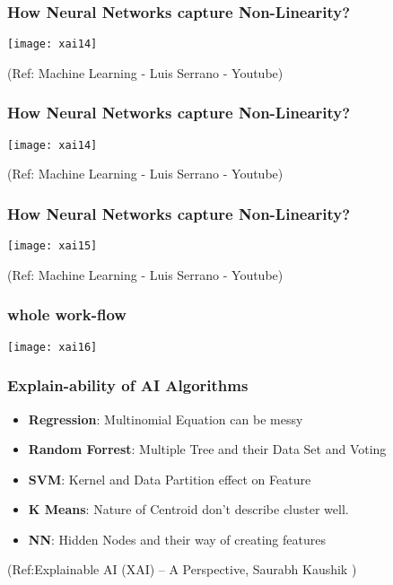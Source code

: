 \begin{frame}[fragile]\frametitle{How Neural Networks capture Non-Linearity?}
\begin{center}
\texttt{[image: xai14]}
\end{center}

\tiny{(Ref: Machine Learning - Luis Serrano - Youtube)}
\end{frame}

\begin{frame}[fragile]\frametitle{How Neural Networks capture Non-Linearity?}
\begin{center}
\texttt{[image: xai14]}
\end{center}

\tiny{(Ref: Machine Learning - Luis Serrano - Youtube)}
\end{frame}

\begin{frame}[fragile]\frametitle{How Neural Networks capture Non-Linearity?}
\begin{center}
\texttt{[image: xai15]}
\end{center}

\tiny{(Ref: Machine Learning - Luis Serrano - Youtube)}
\end{frame}

\begin{frame}[fragile]\frametitle{whole work-flow}
\begin{center}
\texttt{[image: xai16]}
\end{center}

\end{frame}

\begin{frame}[fragile]\frametitle{Explain-ability of AI Algorithms}
\begin{itemize}
\item {\bf Regression}: Multinomial Equation can be messy 
\item {\bf Random Forrest}: Multiple Tree and their Data Set and Voting 
\item {\bf SVM}: Kernel and Data Partition effect on Feature 
\item {\bf K Means}: Nature of Centroid don't describe cluster well. 
\item {\bf NN}: Hidden Nodes and their way of creating features 
\end{itemize}

\tiny{(Ref:Explainable AI (XAI) – A Perspective, Saurabh Kaushik  )}

\end{frame}

